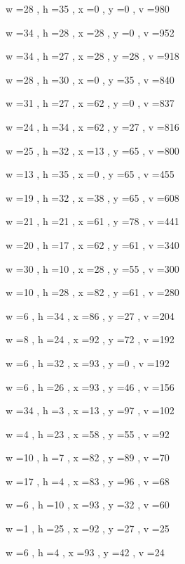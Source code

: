 \documentclass[11pt]{article}
\begin{document}
w =28 , h =35 , x =0 , y =0 , v =980
\par
w =34 , h =28 , x =28 , y =0 , v =952
\par
w =34 , h =27 , x =28 , y =28 , v =918
\par
w =28 , h =30 , x =0 , y =35 , v =840
\par
w =31 , h =27 , x =62 , y =0 , v =837
\par
w =24 , h =34 , x =62 , y =27 , v =816
\par
w =25 , h =32 , x =13 , y =65 , v =800
\par
w =13 , h =35 , x =0 , y =65 , v =455
\par
w =19 , h =32 , x =38 , y =65 , v =608
\par
w =21 , h =21 , x =61 , y =78 , v =441
\par
w =20 , h =17 , x =62 , y =61 , v =340
\par
w =30 , h =10 , x =28 , y =55 , v =300
\par
w =10 , h =28 , x =82 , y =61 , v =280
\par
w =6 , h =34 , x =86 , y =27 , v =204
\par
w =8 , h =24 , x =92 , y =72 , v =192
\par
w =6 , h =32 , x =93 , y =0 , v =192
\par
w =6 , h =26 , x =93 , y =46 , v =156
\par
w =34 , h =3 , x =13 , y =97 , v =102
\par
w =4 , h =23 , x =58 , y =55 , v =92
\par
w =10 , h =7 , x =82 , y =89 , v =70
\par
w =17 , h =4 , x =83 , y =96 , v =68
\par
w =6 , h =10 , x =93 , y =32 , v =60
\par
w =1 , h =25 , x =92 , y =27 , v =25
\par
w =6 , h =4 , x =93 , y =42 , v =24
\par
\newpage
\end{document}
